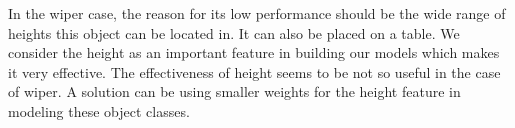 In the wiper case, the reason for its low performance should be the wide range of heights this object can be located in. It can also be placed on a table.
We consider the height as an important feature in building our models which makes it very effective.
The effectiveness of height seems to be not so useful in the case of wiper.
A solution can be using smaller weights for the height feature in modeling these object classes.

\begin{figure} [htp]
   \begin{center}
     \\

\end{center}
\end{figure}
